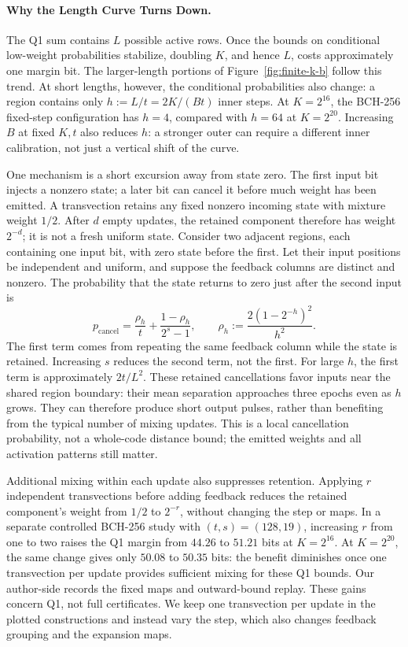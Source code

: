 

\paragraph{Why the Length Curve Turns Down.}
The Q1 sum contains $L$ possible active rows. Once the bounds on conditional
low-weight probabilities stabilize, doubling $K$, and hence $L$, costs
approximately one margin bit. The larger-length portions of
Figure~\ref{fig:finite-k-b} follow this trend. At short lengths, however,
the conditional probabilities also change: a region contains only
$h:=L/t=2K/(Bt)$ inner steps. At $K=2^{16}$, the BCH-256 fixed-step
configuration has $h=4$, compared with $h=64$ at $K=2^{20}$.
Increasing $B$ at fixed $K,t$ also reduces $h$: a stronger outer can
require a different inner calibration, not just a vertical shift of the curve.

One mechanism is a short excursion away from state zero. The first input
bit injects a nonzero state; a later bit can cancel it before much weight
has been emitted. A transvection retains any fixed nonzero incoming state
with mixture weight $1/2$. After $d$ empty updates, the retained component
therefore has weight $2^{-d}$; it is not a fresh uniform state.
Consider two adjacent regions, each containing one input bit, with zero
state before the first. Let their input positions be independent and
uniform, and suppose the feedback columns are distinct and nonzero.
The probability that the state returns to zero just after the second input is
\[
 p_{\mathrm{cancel}}
 =\frac{\rho_h}{t}+\frac{1-\rho_h}{2^s-1},
 \qquad \rho_h:=\frac{2(1-2^{-h})^2}{h^2}.
\]
The first term comes from repeating the same feedback column while the
state is retained. Increasing $s$ reduces the second term, not the first.
For large $h$, the first term is approximately $2t/L^2$.
These retained cancellations favor inputs near the shared region boundary:
their mean separation approaches three epochs even as $h$ grows.
They can therefore produce short output pulses, rather than benefiting
from the typical number of mixing updates.
This is a local cancellation probability, not a whole-code distance bound;
the emitted weights and all activation patterns still matter.

Additional mixing within each update also suppresses retention. Applying
$r$ independent transvections before adding feedback reduces the retained
component's weight from $1/2$ to $2^{-r}$, without changing the step or maps.
In a separate controlled BCH-256 study with $(t,s)=(128,19)$, increasing
$r$ from one to two raises the Q1 margin from $44.26$ to $51.21$ bits at
$K=2^{16}$. At $K=2^{20}$, the same change gives only $50.08$ to $50.35$
bits: the benefit diminishes once one transvection per update provides
sufficient mixing for these Q1 bounds. Our author-side
records the fixed maps and outward-bound replay. These gains concern Q1,
not full certificates. We keep one transvection per update in the plotted
constructions and instead vary the step, which also changes feedback
grouping and the expansion maps.

